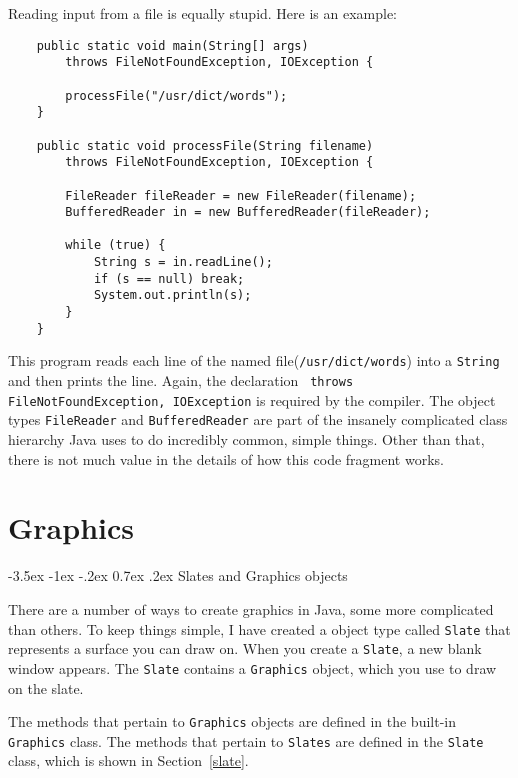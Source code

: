 \documentclass{book}
\makeatletter
\newcounter{exercisenum}
\renewcommand{\section}{\@startsection 
    {section} {1} {0mm}%
    {-3.5ex \@plus -1ex \@minus -.2ex}%
    {0.7ex \@plus.2ex}%
    {\normalfont\Large\bfseries}}
\newcommand{\clearemptydoublepage}{\newpage{\pagestyle{empty}\cleardoublepage}}
\newcommand{\beforechapter}{
    \cleardoublepage 
    \setcounter{exercisenum}{0}
}
\makeatother
\begin{document}
Reading input from a file is equally stupid.  Here is an
example:

\begin{verbatim}
    public static void main(String[] args)
        throws FileNotFoundException, IOException {
	
        processFile("/usr/dict/words");
    }

    public static void processFile(String filename)
        throws FileNotFoundException, IOException {

        FileReader fileReader = new FileReader(filename);
        BufferedReader in = new BufferedReader(fileReader);

        while (true) {
            String s = in.readLine();
            if (s == null) break;
            System.out.println(s);
        }
    }
\end{verbatim}

This program reads each line of the named file({\tt /usr/dict/words})
into a {\tt String} and then prints the line.  Again, the declaration {\tt
throws FileNotFoundException, IOException} is required by the
compiler.  The object types {\tt FileReader} and {\tt BufferedReader}
are part of the insanely complicated class hierarchy Java uses to do
incredibly common, simple things.  Other than that, there is not
much value in the details of how this code fragment works.


\beforechapter
\chapter{Graphics}

\section{Slates and Graphics objects}
\label{graphics}

There are a number of ways to create graphics in Java, some more
complicated than others.  To keep things simple, I have created
a object type called {\tt Slate} that represents a surface you can
draw on.  When you create a {\tt Slate}, a new blank window appears.
The {\tt Slate} contains a {\tt Graphics} object, which you use
to draw on the slate.

The methods that pertain to {\tt Graphics} objects are defined
in the built-in {\tt Graphics} class.  The methods that pertain
to {\tt Slates} are defined in the {\tt Slate} class, which is
shown in Section~\ref{slate}.
\end{document}
